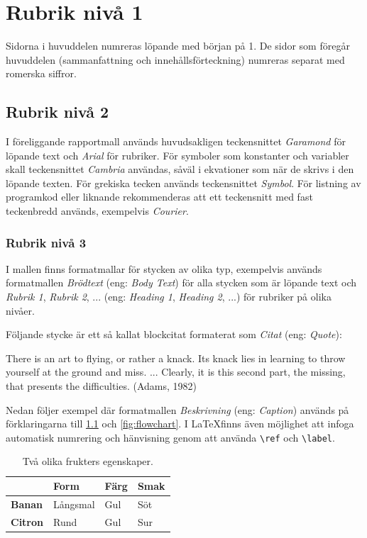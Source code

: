 \chapter{Rubrik nivå 1}
Sidorna i huvuddelen numreras löpande med början på 1. De sidor som föregår
huvuddelen (sammanfattning och innehållsförteckning) numreras separat med
romerska siffror. 

\section{Rubrik nivå 2}
I föreliggande rapportmall används huvudsakligen teckensnittet
\textit{Garamond} för löpande text och \textit{Arial} för rubriker. För
symboler som konstanter och variabler skall teckensnittet \textit{Cambria}
användas, såväl i ekvationer som när de skrivs i den löpande texten. För
grekiska tecken används teckensnittet \textit{Symbol}. För listning av
programkod eller liknande rekommenderas att ett teckensnitt med fast
teckenbredd används, exempelvis \textit{Courier}.

\subsection{Rubrik nivå 3}
I mallen finns formatmallar för stycken av olika typ, exempelvis används
formatmallen \textit{Brödtext} (eng: \textit{Body Text}) för alla stycken
som är löpande text och \textit{Rubrik 1}, \textit{Rubrik 2}, ... (eng:
\textit{Heading 1}, \textit{Heading 2}, ...) för rubriker på olika nivåer.

Följande stycke är ett så kallat blockcitat formaterat som \textit{Citat}
(eng: \textit{Quote}):

\begin{displayquote}
    There is an art to flying, or rather a knack. Its knack lies in learning
    to throw yourself at the ground and miss. ... Clearly, it is this
    second part, the missing, that presents the difficulties. (Adams, 1982)
\end{displayquote}

Nedan följer exempel där formatmallen \textit{Beskrivning} (eng:
\textit{Caption}) används på förklaringarna till \ref{tab:fruits} och 
\ref{fig:flowchart}. I \LaTeX finns även möjlighet att infoga automatisk
numrering och hänvisning genom att använda \verb|\ref| och \verb|\label|.

\begin{table}[ht!]
    \label{tab:fruits}
    \centering
    \caption{Två olika frukters egenskaper.}
    \begin{tabular}{|l|l|l|l|}
        \hline
        & \textbf{Form} & \textbf{Färg} & \textbf{Smak} \\
        \hline
        \textbf{Banan} & Långsmal & Gul & Söt \\
        \hline
        \textbf{Citron} & Rund & Gul & Sur \\
        \hline
    \end{tabular}
\end{table}

